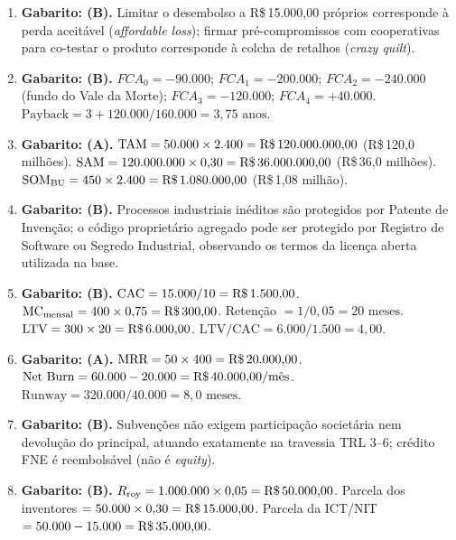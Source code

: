 \begin{boxGabarito}
  \begin{enumerate}[leftmargin=1.5em, itemsep=4pt]
    \item \textbf{Gabarito: (B).} Limitar o desembolso a R\$\,15.000,00 próprios corresponde à perda aceitável (\textit{affordable loss}); firmar pré-compromissos com cooperativas para co-testar o produto corresponde à colcha de retalhos (\textit{crazy quilt}).
    \item \textbf{Gabarito: (B).} $FCA_0 = -90.000$; $FCA_1 = -200.000$; $FCA_2 = -240.000$ (fundo do Vale da Morte); $FCA_3 = -120.000$; $FCA_4 = +40.000$. $\text{Payback} = 3 + 120.000 / 160.000 = 3{,}75\text{ anos}$.
    \item \textbf{Gabarito: (A).} $\text{TAM} = 50.000 \times 2.400 = \text{R\$\,120.000.000,00}$ (R\$\,120,0 milhões). $\text{SAM} = 120.000.000 \times 0{,}30 = \text{R\$\,36.000.000,00}$ (R\$\,36,0 milhões). $\text{SOM}_{\text{BU}} = 450 \times 2.400 = \text{R\$\,1.080.000,00}$ (R\$\,1,08 milhão).
    \item \textbf{Gabarito: (B).} Processos industriais inéditos são protegidos por Patente de Invenção; o código proprietário agregado pode ser protegido por Registro de Software ou Segredo Industrial, observando os termos da licença aberta utilizada na base.
    \item \textbf{Gabarito: (B).} $\text{CAC} = 15.000 / 10 = \text{R\$\,1.500,00}$. $\text{MC}_{\text{mensal}} = 400 \times 0{,}75 = \text{R\$\,300,00}$. Retenção $= 1 / 0{,}05 = 20\text{ meses}$. $\text{LTV} = 300 \times 20 = \text{R\$\,6.000,00}$. $\text{LTV/CAC} = 6.000 / 1.500 = 4{,}00$.
    \item \textbf{Gabarito: (A).} $\text{MRR} = 50 \times 400 = \text{R\$\,20.000,00}$. $\text{Net Burn} = 60.000 - 20.000 = \text{R\$\,40.000,00/mês}$. $\text{Runway} = 320.000 / 40.000 = 8{,}0\text{ meses}$.
    \item \textbf{Gabarito: (B).} Subvenções não exigem participação societária nem devolução do principal, atuando exatamente na travessia TRL 3–6; crédito FNE é reembolsável (não é \textit{equity}).
    \item \textbf{Gabarito: (B).} $R_{\text{roy}} = 1.000.000 \times 0{,}05 = \text{R\$\,50.000,00}$. Parcela dos inventores $= 50.000 \times 0{,}30 = \text{R\$\,15.000,00}$. Parcela da ICT/NIT $= 50.000 - 15.000 = \text{R\$\,35.000,00}$.
  \end{enumerate}
\end{boxGabarito}

